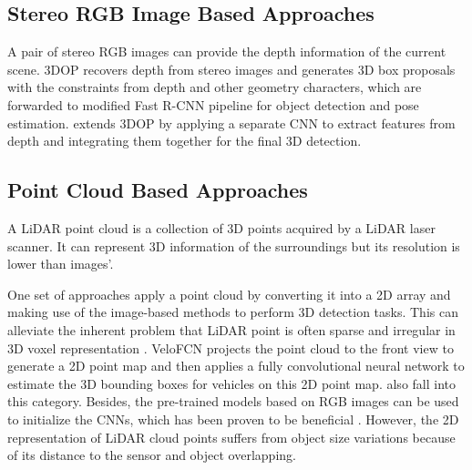 \subsection{Stereo RGB Image Based Approaches}
A pair of stereo RGB images can provide the depth information of the current scene. 3DOP \cite{DBLP:journals/corr/ChenKZMFU16} recovers depth from stereo images and generates 3D box proposals with the constraints from depth and other geometry characters, which are forwarded to modified Fast R-CNN \cite{DBLP:journals/corr/Girshick15} pipeline for object detection and pose estimation. \cite{PHAM2017110} extends 3DOP by applying a separate CNN to extract features from depth and integrating them together for the final 3D detection.


\subsection{Point Cloud Based Approaches}

A LiDAR point cloud is a collection of 3D points acquired by a LiDAR laser scanner. It can represent 3D information of the surroundings but its resolution is lower than images'.

One set of approaches apply a point cloud by converting it into a 2D array and making use of the image-based methods to perform 3D detection tasks. This can alleviate the inherent problem that LiDAR point is often sparse and irregular in 3D voxel representation . VeloFCN \cite{DBLP:journals/corr/LiZX16} projects the point cloud to the front view to generate a 2D point map and then applies a fully convolutional neural network to estimate the 3D bounding boxes for vehicles on this 2D point map. \cite{DBLP:journals/corr/abs-1710-07368, Chen:2015:OPA:2969239.2969287} also fall into this category. Besides, the pre-trained models based on RGB images can be used to initialize the CNNs, which has been proven to be beneficial \cite{DBLP:journals/corr/GuptaGAM14}. However, the 2D representation of LiDAR cloud points suffers from object size variations because of its distance to the sensor and object overlapping.

